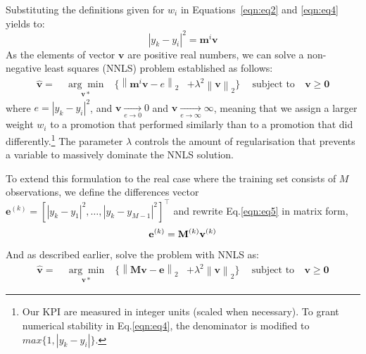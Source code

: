 \documentclass{ieeeaccess}
\newcommand\norm[1]{\left\lVert#1\right\rVert}
\begin{document}
%
Substituting the definitions given for $w_i$ in Equations~\eqref{eqn:eq2} and \eqref{eqn:eq4} yields to:
\begin{equation}
|y_k - y_i|^2 = \mathbf{m}^i \mathbf{v}
\label{eqn:eq5}
\end{equation}
%
As the elements of vector $\mathbf{v}$ are positive real numbers, we can solve a non-negative least squares (NNLS) problem established as follows:
\begin{equation}
\begin{aligned}
\hat{\mathbf{v}} =~ & \underset{\mathbf{v*}}{\arg\min}
& \{ \norm{ \mathbf{m}^i \mathbf{v} - e }_2
& + \lambda^2 \norm{ \mathbf{v} }_2 \}
&~~ \text{subject to}
&~\mathbf{v} \geq \mathbf{0}
\end{aligned}
\label{eqn:nnls}
\end{equation}
where $e=|y_k - y_i|^2$, and $\mathbf{v} \xrightarrow[e \to 0]{} 0$ and $\mathbf{v} \xrightarrow[e \to \infty]{} \infty$, meaning that  we assign a larger weight $w_i$ to a promotion that performed similarly than to a promotion that did differently.\footnote{Our KPI are measured in integer units (scaled when necessary). To grant numerical stability in Eq.\eqref{eqn:eq4}, the denominator is modified to $max\{1, |y_k - y_i|\}.$} The parameter $\lambda$ controls the amount of regularisation that prevents a variable to massively dominate the NNLS solution.

To extend this formulation to the real case where the training set consists of $M$ observations, we define the differences vector $\mathbf{e}^{(k)} = [ |y_k - y_1|^2, \ldots , |y_k - y_{M-1}|^2 ]^\top$ and rewrite Eq.\eqref{eqn:eq5} in matrix form,
\begin{equation}
\mathbf{e}^{(k)}= \mathbf{M}^{(k)} \mathbf{v}^{(k)} \\
\label{eqn:eq6}
\end{equation}
%
And as described earlier, solve the problem with NNLS as:
\begin{equation}
\begin{aligned}
\hat{\mathbf{v}} =~ & \underset{\mathbf{v*}}{\arg\min}
& \{ \norm{ \mathbf{M} \mathbf{v} - \mathbf{e} }_2
& + \lambda^2 \norm{ \mathbf{v} }_2 \}
&~~ \text{subject to}
&~\mathbf{v} \geq \mathbf{0}
\end{aligned}
\label{eqn:nnlsMatrix}
\end{equation}
%
\end{document}
